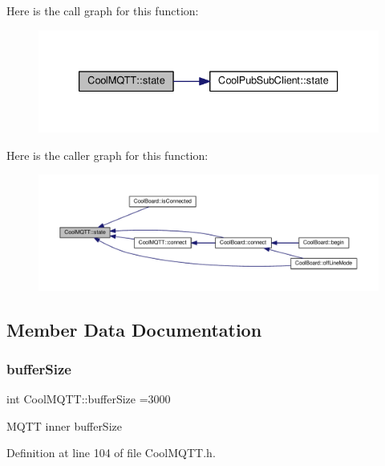Here is the call graph for this function\+:
\nopagebreak
\begin{figure}[H]
\begin{center}
\leavevmode
\includegraphics[width=333pt]{class_cool_m_q_t_t_a5d003307eff78efbd585e42b43b72b6d_cgraph}
\end{center}
\end{figure}
Here is the caller graph for this function\+:
\nopagebreak
\begin{figure}[H]
\begin{center}
\leavevmode
\includegraphics[width=350pt]{class_cool_m_q_t_t_a5d003307eff78efbd585e42b43b72b6d_icgraph}
\end{center}
\end{figure}


\subsection{Member Data Documentation}
\mbox{\label{class_cool_m_q_t_t_a7f3cf26b51d6770f216e42c5ef13ca9f}} 
\subsubsection{\texorpdfstring{buffer\+Size}{bufferSize}}
{\footnotesize\ttfamily int Cool\+M\+Q\+T\+T\+::buffer\+Size =3000\hspace{0.3cm}{\ttfamily [private]}}

M\+Q\+TT inner buffer\+Size 

Definition at line 104 of file Cool\+M\+Q\+T\+T.\+h.

